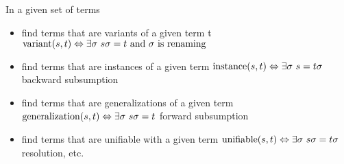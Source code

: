 
\begin{definition}
In a given set of terms
\begin{itemize}

\item find terms that are variants of a given term t
$\operatorname{variant}(s,t)\Leftrightarrow \exists\sigma\ s\sigma = t\text{ and }\sigma\text{ is renaming}$

\item find terms that are  instances of a given term  
$\operatorname{instance}(s,t)\Leftrightarrow\exists\sigma\ s = t\sigma$
\hfill{\footnotesize backward subsumption}

\item find terms that are  generalizations of a given term
$\operatorname{generalization}(s,t)\Leftrightarrow\exists\sigma\ s\sigma = t$
\hfill{\footnotesize forward subsumption}

\item {find terms that are  unifiable with a given term} 
$\UNIF(s,t)\Leftrightarrow\exists\sigma\ s\sigma = t\sigma$
\hfill{\footnotesize resolution, etc.}

\end{itemize}
\end{definition}
